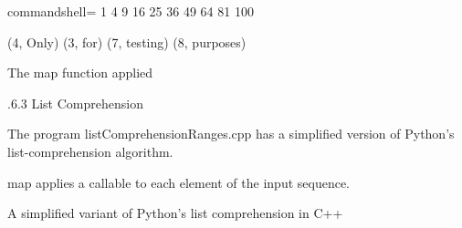 \begin{tcblisting}{commandshell={}}
1 4 9 16 25 36 49 64 81 100

(4, Only) (3, for) (7, testing) (8, purposes)
\end{tcblisting}

\begin{center}
The map function applied
\end{center}

.6.3\hspace{0.2cm} List Comprehension

The program listComprehensionRanges.cpp has a simplified version of Python’s list-comprehension algorithm.

map applies a callable to each element of the input sequence.

\noindent
A simplified variant of Python’s list comprehension in C++
